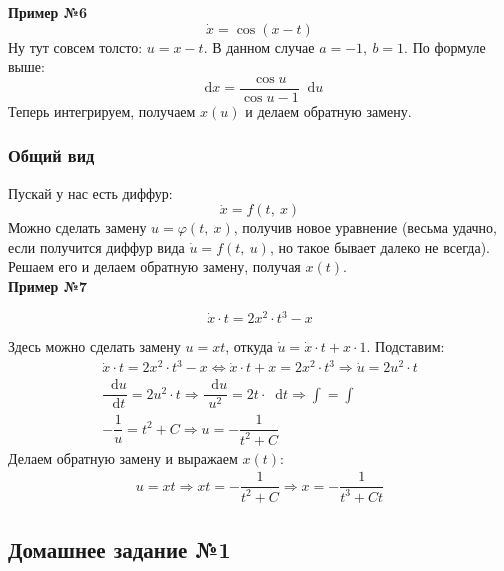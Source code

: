 \documentclass[a4paper,12pt]{article}
\renewcommand*\d{\mathop{}\!\mathrm{d}}
\newcommand{\du}{\dot{u}}
\newcommand{\dx}{\dot{x}}
\newcommand{\ds}{\displaystyle}
\begin{document}
\textbf{Пример №6}
\[\dx = \cos (x - t)\]
Ну тут совсем толсто: $u = x - t$. В данном случае $a = -1,\ b = 1$. По формуле выше:
\[\d x = \dfrac{\cos u}{\cos u - 1}\d u\]
Теперь интегрируем, получаем $x(u)$ и делаем обратную замену.

\subsubsection{Общий вид}

Пускай у нас есть диффур:
\[\dx = f(t,\ x)\]
Можно сделать замену $u = \varphi(t,\ x)$, получив новое уравнение (весьма удачно, если получится диффур вида $\du = f(t,\ u)$, но такое бывает далеко не всегда). Решаем его и делаем обратную замену, получая $x(t)$.
\ \\

\textbf{Пример №7}

\[\dx \cdot t = 2x^2 \cdot t^3 - x\]

Здесь можно сделать замену $u = xt$, откуда $\du = \dx \cdot t + x \cdot 1$. Подставим:
\begin{gather*}
	\dx \cdot t = 2x^2 \cdot t^3 - x \iff \dx \cdot t + x = 2x^2 \cdot t^3 \Longrightarrow \du = 2u^2 \cdot t \\
	\dfrac{\d u}{\d t} = 2u^2 \cdot t \Longrightarrow \dfrac{\d u}{u^2} = 2t \cdot \d t \Longrightarrow \ds\int = \int\\
	-\dfrac{1}{u} = t^2 + C \Longrightarrow u = -\dfrac{1}{t^2 + C}
\end{gather*}
Делаем обратную замену и выражаем $x(t)$:
\begin{gather*}
	u = xt \Longrightarrow xt = -\dfrac{1}{t^2 + C} \Longrightarrow x = -\dfrac{1}{t^3 + Ct}
\end{gather*}

\subsection{Домашнее задание №1}
\end{document}
